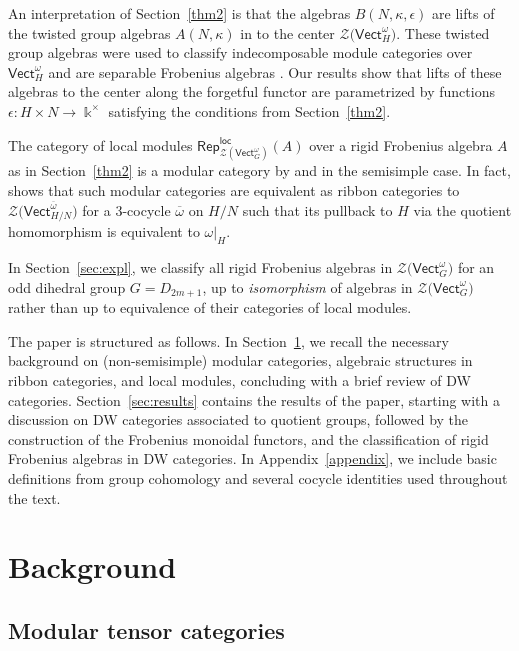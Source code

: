 \documentclass[10pt,a4paper]{amsart}
\numberwithin{equation}{section}
\newcommand{\ov}[1]{\overline{#1}}
\newcommand{\locmod}{\mathsf{Rep}^{\mathsf{loc}}}
\newcommand{\Vect}{\mathsf{Vect}}
\newcommand{\cZ}{\mathcal{Z}}
\begin{document}
An interpretation of Section~\ref{thm2} is that the algebras $B(N,\kappa,\epsilon)$ are lifts of the twisted group algebras $A(N,\kappa)$ in \smash{$\Vect_H^{\omega|_H}$} to the center $\cZ\big(\Vect_H^\omega\big)$. These twisted group algebras were used to classify indecomposable module categories over $\Vect_H^\omega$ \cite{Nat,Ost} and are separable Frobenius algebras \cite{WINART}.
Our results show that lifts of these algebras to the center along the forgetful functor are parametrized by functions $\epsilon\colon H\times N\to \Bbbk^\times$ satisfying the conditions from Section~\ref{thm2}.

The category of local modules $\locmod_{\cZ(\Vect_{G}^\omega)}(A)$ over a rigid Frobenius algebra $A$ as in Section~\ref{thm2} is a modular category by \cite[Theorem 4.12]{LW3} and \cite[Theorem~4.5]{KO} in the semisimple case. In fact, \cite[Theorem~3.16]{DS} shows that such modular categories are equivalent as ribbon categories to~$\cZ\big(\Vect_{H/N}^{\ov{\omega}}\big)$ for a $3$-cocycle $\ov{\omega}$ on $H/N$ such that its pullback to $H$ via the quotient homomorphism is equivalent to $\omega|_H$.

In Section~\ref{sec:expl}, we classify all rigid Frobenius algebras in $\cZ\big(\Vect_G^\omega\big)$ for an odd dihedral group $G=D_{2m+1}$, up to \emph{isomorphism} of algebras in $\cZ\big(\Vect_G^\omega\big)$ rather than up to equivalence of their categories of local modules.

The paper is structured as follows. In Section~\ref{sec:background}, we recall the necessary background on (non-semisimple) modular categories, algebraic structures in ribbon categories, and local modules, concluding with a brief review of DW categories. Section~\ref{sec:results} contains the results of the paper, starting with a discussion on DW categories associated to quotient groups, followed by the construction of the Frobenius monoidal functors, and the classification of rigid Frobenius algebras in DW categories. In Appendix~\ref{appendix}, we include basic definitions from group cohomology and several cocycle identities used throughout the text.

\section{Background}\label{sec:background}

\subsection{Modular tensor categories}
\end{document}
